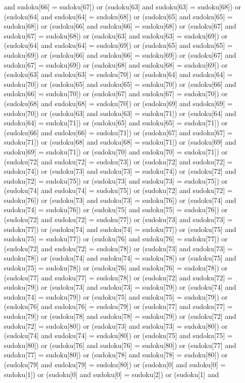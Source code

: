 \documentclass[8pt]{article}
\begin{document}
\begin{algorithm}[H]
and sudoku[66] = sudoku[67]) or (sudoku[63]  and sudoku[63] = sudoku[68]) or (sudoku[64]  and sudoku[64] = sudoku[68]) or (sudoku[65]  and sudoku[65] = sudoku[68]) or (sudoku[66]  and sudoku[66] = sudoku[68]) or (sudoku[67]  and sudoku[67] = sudoku[68]) or (sudoku[63]  and sudoku[63] = sudoku[69]) or (sudoku[64]  and sudoku[64] = sudoku[69]) or (sudoku[65]  and sudoku[65] = sudoku[69]) or (sudoku[66]  and sudoku[66] = sudoku[69]) or (sudoku[67]  and sudoku[67] = sudoku[69]) or (sudoku[68]  and sudoku[68] = sudoku[69]) or (sudoku[63]  and sudoku[63] = sudoku[70]) or (sudoku[64]  and sudoku[64] = sudoku[70]) or (sudoku[65]  and sudoku[65] = sudoku[70]) or (sudoku[66]  and sudoku[66] = sudoku[70]) or (sudoku[67]  and sudoku[67] = sudoku[70]) or (sudoku[68]  and sudoku[68] = sudoku[70]) or (sudoku[69]  and sudoku[69] = sudoku[70]) or (sudoku[63]  and sudoku[63] = sudoku[71]) or (sudoku[64]  and sudoku[64] = sudoku[71]) or (sudoku[65]  and sudoku[65] = sudoku[71]) or (sudoku[66]  and sudoku[66] = sudoku[71]) or (sudoku[67]  and sudoku[67] = sudoku[71]) or (sudoku[68]  and sudoku[68] = sudoku[71]) or (sudoku[69]  and sudoku[69] = sudoku[71]) or (sudoku[70]  and sudoku[70] = sudoku[71]) or (sudoku[72]  and sudoku[72] = sudoku[73]) or (sudoku[72]  and sudoku[72] = sudoku[74]) or (sudoku[73]  and sudoku[73] = sudoku[74]) or (sudoku[72]  and sudoku[72] = sudoku[75]) or (sudoku[73]  and sudoku[73] = sudoku[75]) or (sudoku[74]  and sudoku[74] = sudoku[75]) or (sudoku[72]  and sudoku[72] = sudoku[76]) or (sudoku[73]  and sudoku[73] = sudoku[76]) or (sudoku[74]  and sudoku[74] = sudoku[76]) or (sudoku[75]  and sudoku[75] = sudoku[76]) or (sudoku[72]  and sudoku[72] = sudoku[77]) or (sudoku[73]  and sudoku[73] = sudoku[77]) or (sudoku[74]  and sudoku[74] = sudoku[77]) or (sudoku[75]  and sudoku[75] = sudoku[77]) or (sudoku[76]  and sudoku[76] = sudoku[77]) or (sudoku[72]  and sudoku[72] = sudoku[78]) or (sudoku[73]  and sudoku[73] = sudoku[78]) or (sudoku[74]  and sudoku[74] = sudoku[78]) or (sudoku[75]  and sudoku[75] = sudoku[78]) or (sudoku[76]  and sudoku[76] = sudoku[78]) or (sudoku[77]  and sudoku[77] = sudoku[78]) or (sudoku[72]  and sudoku[72] = sudoku[79]) or (sudoku[73]  and sudoku[73] = sudoku[79]) or (sudoku[74]  and sudoku[74] = sudoku[79]) or (sudoku[75]  and sudoku[75] = sudoku[79]) or (sudoku[76]  and sudoku[76] = sudoku[79]) or (sudoku[77]  and sudoku[77] = sudoku[79]) or (sudoku[78]  and sudoku[78] = sudoku[79]) or (sudoku[72]  and sudoku[72] = sudoku[80]) or (sudoku[73]  and sudoku[73] = sudoku[80]) or (sudoku[74]  and sudoku[74] = sudoku[80]) or (sudoku[75]  and sudoku[75] = sudoku[80]) or (sudoku[76]  and sudoku[76] = sudoku[80]) or (sudoku[77]  and sudoku[77] = sudoku[80]) or (sudoku[78]  and sudoku[78] = sudoku[80]) or (sudoku[79]  and sudoku[79] = sudoku[80]) or (sudoku[0]  and sudoku[0] = sudoku[1]) or (sudoku[0]  and sudoku[0] = sudoku[2]) or (sudoku[1]  and 
\end{algorithm}
\end{document}
